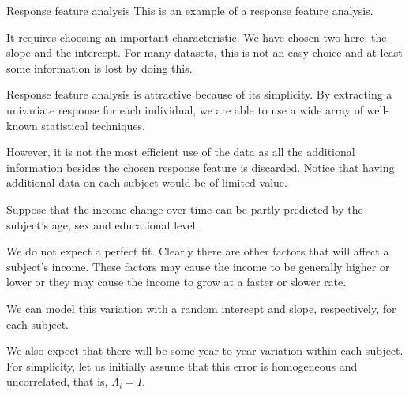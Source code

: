 \documentclass[
  ignorenonframetext,
]{beamer}
\begin{document}
\begin{frame}{Response feature analysis}
\protect\hypertarget{response-feature-analysis}{}
This is an example of a response feature analysis.

It requires choosing an important characteristic. We have chosen two
here: the slope and the intercept. For many datasets, this is not an
easy choice and at least some information is lost by doing this.

Response feature analysis is attractive because of its simplicity. By
extracting a univariate response for each individual, we are able to use
a wide array of well-known statistical techniques.

However, it is not the most efficient use of the data as all the
additional information besides the chosen response feature is discarded.
Notice that having additional data on each subject would be of limited
value.
\end{frame}

\begin{frame}{}
\protect\hypertarget{section-25}{}
Suppose that the income change over time can be partly predicted by the
subject's age, sex and educational level.

We do not expect a perfect fit. Clearly there are other factors that
will affect a subject's income. These factors may cause the income to be
generally higher or lower or they may cause the income to grow at a
faster or slower rate.

We can model this variation with a random intercept and slope,
respectively, for each subject.

We also expect that there will be some year-to-year variation within
each subject. For simplicity, let us initially assume that this error is
homogeneous and uncorrelated, that is, \(\Lambda_i = I\).
\end{frame}
\end{document}
